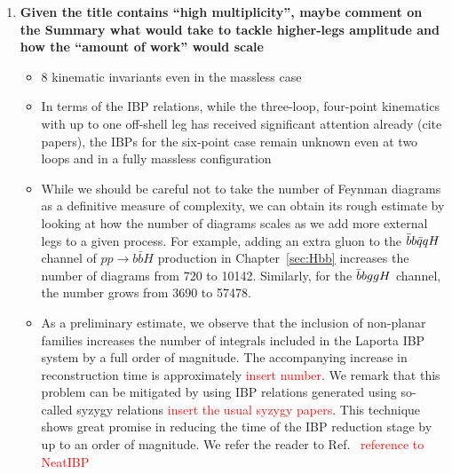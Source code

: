 \documentclass[main.tex]{subfiles}
\begin{document}
\begin{enumerate}
\item \textbf{Given the title contains “high multiplicity”, maybe comment on the Summary what
would take to tackle higher-legs amplitude and how the “amount of work” would
scale}
\begin{itemize}
    \item 8 kinematic invariants even in the massless case
    \item In terms of the IBP relations, while the three-loop, four-point kinematics with up to one off-shell leg has received significant attention already (cite papers), the IBPs for the six-point case remain unknown even at two loops and in a fully massless configuration
    \item While we should be careful not to take the number of Feynman diagrams as a definitive measure of complexity, we can obtain its rough estimate by looking at how the number of diagrams scales as we add more external legs to a given process. For example, adding an extra gluon to the $\bar{b}b\bar{q}qH$ channel of $pp\to b\bar{b}H$ production in Chapter~\ref{sec:Hbb} increases the number of diagrams from 720 to 10142. Similarly, for the $\bar{b}bggH$ channel, the number grows from 3690 to 57478.
    \item As a preliminary estimate, we observe that the inclusion of non-planar families increases the number of integrals included in the Laporta IBP system by a full order of magnitude. The accompanying increase in reconstruction time is approximately \textcolor{red}{insert number}.
    We remark that this problem can be mitigated by using IBP relations generated using so-called syzygy relations \textcolor{red}{insert the usual syzygy papers}. This technique shows great promise in reducing the time of the IBP reduction stage by up to an order of magnitude. We refer the reader to Ref.~\cite{NeatIBP} \textcolor{red}{reference to NeatIBP}
\end{itemize}
\end{enumerate}
\end{document}
